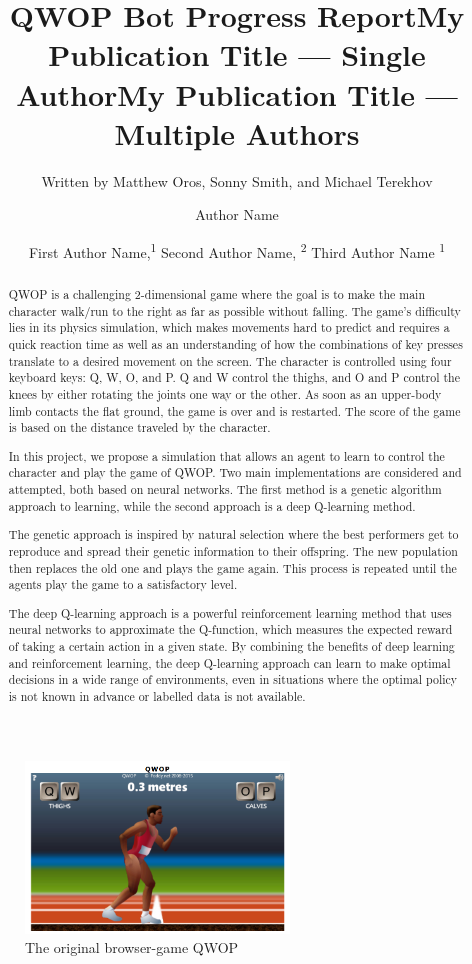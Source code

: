 \documentclass[letterpaper]{article} %
\title{QWOP Bot Progress Report}
\author{
    Written by Matthew Oros, Sonny Smith, and Michael Terekhov \\ 
}
\title{My Publication Title --- Single Author}
\author {
    Author Name \\
}
\title{My Publication Title --- Multiple Authors}
\author {
    First Author Name,\textsuperscript{\rm 1}
    Second Author Name, \textsuperscript{\rm 2}
    Third Author Name \textsuperscript{\rm 1} \\
}
\begin{document}
\maketitle

\begin{abstract}

QWOP is a challenging 2-dimensional game where the goal is to make the main character walk/run to the right as far as possible without falling. The game's difficulty lies in its physics simulation, which makes movements hard to predict and requires a quick reaction time as well as an understanding of how the combinations of key presses translate to a desired movement on the screen. The character is controlled using four keyboard keys: Q, W, O, and P. Q and W control the thighs, and O and P control the knees by either rotating the joints one way or the other. As soon as an upper-body limb contacts the flat ground, the game is over and is restarted. The score of the game is based on the distance traveled by the character.

\par In this project, we propose a simulation that allows an agent to learn to control the character and play the game of QWOP. Two main implementations are considered and attempted, both based on neural networks. The first method is a genetic algorithm approach to learning, while the second approach is a deep Q-learning method.

\par The genetic approach is inspired by natural selection where the best performers get to reproduce and spread their genetic information to their offspring. The new population then replaces the old one and plays the game again. This process is repeated until the agents play the game to a satisfactory level.

\par The deep Q-learning approach is a powerful reinforcement learning method that uses neural networks to approximate the Q-function, which measures the expected reward of taking a certain action in a given state. By combining the benefits of deep learning and reinforcement learning, the deep Q-learning approach can learn to make optimal decisions in a wide range of environments, even in situations where the optimal policy is not known in advance or labelled data is not available.

\end{abstract}

\begin{figure}[h]
\caption{The original browser-game QWOP}
\centering
\includegraphics[width=7cm]{qwop.png}
\end{figure}
\end{document}
